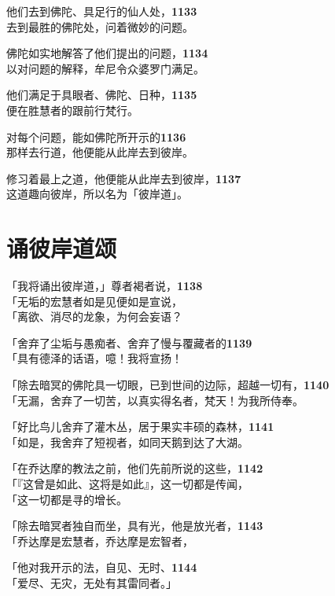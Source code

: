 他们去到佛陀、具足行的仙人处，\hfill{\grayfootnotesize \textbf{1133}} \\
去到最胜的佛陀处，问着微妙的问题。


佛陀如实地解答了他们提出的问题，\hfill{\grayfootnotesize \textbf{1134}} \\
以对问题的解释，牟尼令众婆罗门满足。

他们满足于具眼者、佛陀、日种，\hfill{\grayfootnotesize \textbf{1135}} \\
便在胜慧者的跟前行梵行。


对每个问题，能如佛陀所开示的\hfill{\grayfootnotesize \textbf{1136}} \\
那样去行道，他便能从此岸去到彼岸。

修习着最上之道，他便能从此岸去到彼岸，\hfill{\grayfootnotesize \textbf{1137}} \\
这道趣向彼岸，所以名为「彼岸道」。

\section{诵彼岸道颂}

「我将诵出彼岸道，」尊者褐者说，\hfill{\grayfootnotesize \textbf{1138}} \\
「无垢的宏慧者如是见便如是宣说，\\
「离欲、消尽的龙象，为何会妄语？


「舍弃了尘垢与愚痴者、舍弃了慢与覆藏者的\hfill{\grayfootnotesize \textbf{1139}} \\
「具有德泽的话语，噫！我将宣扬！


「除去暗冥的佛陀具一切眼，已到世间的边际，超越一切有，\hfill{\grayfootnotesize \textbf{1140}} \\
「无漏，舍弃了一切苦，以真实得名者，梵天！为我所侍奉。


「好比鸟儿舍弃了灌木丛，居于果实丰硕的森林，\hfill{\grayfootnotesize \textbf{1141}} \\
「如是，我舍弃了短视者，如同天鹅到达了大湖。


「在乔达摩的教法之前，他们先前所说的这些，\hfill{\grayfootnotesize \textbf{1142}} \\
「『这曾是如此、这将是如此』，这一切都是传闻，\\
「这一切都是寻的增长。

「除去暗冥者独自而坐，具有光，他是放光者，\hfill{\grayfootnotesize \textbf{1143}} \\
「乔达摩是宏慧者，乔达摩是宏智者，


「他对我开示的法，自见、无时、\hfill{\grayfootnotesize \textbf{1144}} \\
「爱尽、无灾，无处有其雷同者。」


